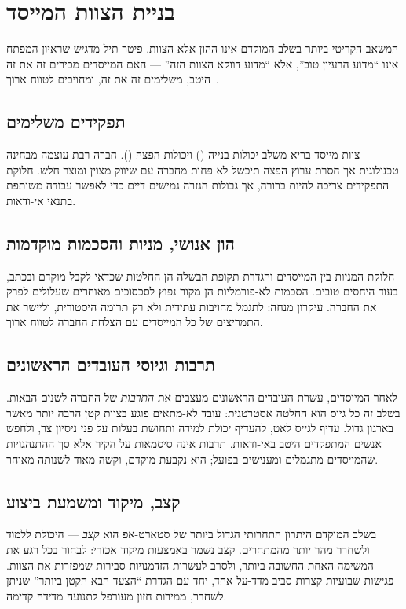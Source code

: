 \chapter{בניית הצוות המייסד}

המשאב הקריטי ביותר בשלב המוקדם אינו ההון אלא הצוות. פיטר תיל מדגיש שראיון
המפתח אינו ``מדוע הרעיון טוב'', אלא ``מדוע דווקא הצוות הזה'' — האם המייסדים
מכירים זה את זה היטב, משלימים זה את זה, ומחויבים לטווח ארוך~\cite{thiel2014zero}.

\section{תפקידים משלימים}

צוות מייסד בריא משלב יכולות בנייה () ויכולות הפצה ().
חברה רבת-עוצמה מבחינה טכנולוגית אך חסרת ערוץ הפצה תיכשל לא פחות מחברה עם שיווק
מצוין ומוצר חלש. חלוקת התפקידים צריכה להיות ברורה, אך גבולות הגזרה גמישים דיים
כדי לאפשר עבודה משותפת בתנאי אי-ודאות.

\section{הון אנושי, מניות והסכמות מוקדמות}

חלוקת המניות בין המייסדים והגדרת תקופת הבשלה  הן החלטות שכדאי
לקבל מוקדם ובכתב, בעוד היחסים טובים. הסכמות לא-פורמליות הן מקור נפוץ לסכסוכים
מאוחרים שעלולים לפרק את החברה. עיקרון מנחה: לתגמל מחויבות עתידית ולא רק תרומה
היסטורית, וליישר את התמריצים של כל המייסדים עם הצלחת החברה לטווח ארוך.

\section{תרבות וגיוסי העובדים הראשונים}

לאחר המייסדים, עשרת העובדים הראשונים מעצבים את \emph{התרבות} של החברה לשנים
הבאות. בשלב זה כל גיוס הוא החלטה אסטרטגית: עובד לא-מתאים פוגע בצוות קטן הרבה
יותר מאשר בארגון גדול. עדיף לגייס לאט, להעדיף יכולת למידה ותחושת בעלות
 על פני ניסיון צר, ולחפש אנשים המתפקדים היטב באי-ודאות.
תרבות אינה סיסמאות על הקיר אלא סך ההתנהגויות שהמייסדים מתגמלים ומענישים בפועל;
היא נקבעת מוקדם, וקשה מאוד לשנותה מאוחר.

\section{קצב, מיקוד ומשמעת ביצוע}

בשלב המוקדם היתרון התחרותי הגדול ביותר של סטארט-אפ הוא \emph{קצב} — היכולת
ללמוד ולשחרר מהר יותר מהמתחרים. קצב נשמר באמצעות מיקוד אכזרי: לבחור בכל רגע
את המשימה האחת החשובה ביותר, ולסרב לעשרות הזדמנויות סבירות שמפזרות את הצוות.
פגישות שבועיות קצרות סביב מדד-על אחד, יחד עם הגדרת ``הצעד הבא הקטן ביותר''
שניתן לשחרר, ממירות חזון מעורפל לתנועה מדידה קדימה.
